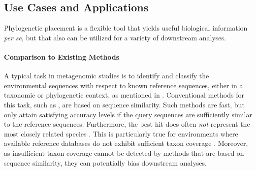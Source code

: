 


\subsection{Use Cases and Applications}
\label{ch:Foundations:sec:PhylogeneticPlacement:sub:UseCasesApplications}

Phylogenetic placement is a flexible tool that yields useful biological information \emph{per se},
but that also can be utilized for a variety of downstream analyses.

\paragraph{Comparison to Existing Methods}
\label{ch:Foundations:sec:PhylogeneticPlacement:sub:UseCasesApplications:par:Comparison}

A typical task in metagenomic studies is to identify and classify the environmental sequences with respect
to known reference sequences, either in a taxonomic or phylogenetic context,
as mentioned in .
Conventional methods for this task, such as  \cite{Altschul1990}, are based on sequence similarity.
Such methods are fast, but only attain satisfying accuracy levels
if the query sequences are sufficiently similar to the reference sequences.
Furthermore, the best  hit does often \emph{not} represent the most closely related species \cite{Koski2001}.
This is particularly true for environments where available reference databases do not exhibit
sufficient taxon coverage \citep{Mahe2017}.
Moreover, as insufficient taxon coverage cannot be detected by methods that are based on sequence similarity,
they can potentially bias downstream analyses.

